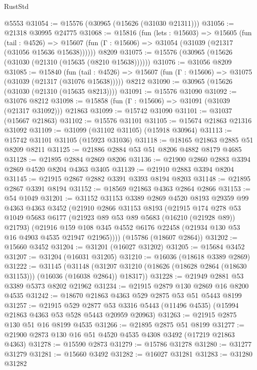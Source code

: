 \begin{lexlean}{RustStd}
\begin{coremodule}
    @5553
@31054 := @15576 (@30965 (@15626 (@31030 @21311)))
@31056 := @21318 @30995 @24775
@31068 := @15816
    (fun (lets : @15603) =>
    @15605
      (fun (tail : @4526) =>
      @15607 (fun (Γ : @15606) => @31054 (@31039 (@21317 (@31056 @15636 @15638))))))
    @8209
@31075 := @15576 (@30965 (@15626 (@31030 (@21310 (@15635 (@8210 @15638))))))
@31076 := @31056 @8209
@31085 := @15840
    (fun (tail : @4526) => @15607 (fun (Γ : @15606) => @31075 (@31039 (@21317 (@31076 @15638)))))
    @8212
@31090 := @30965 (@15626 (@31030 (@21310 (@15635 @8213))))
@31091 := @15576 @31090
@31092 := @31076 @8212
@31098 := @15858 (fun (Γ : @15606) => @31091 (@31039 (@21317 @31092))) @21863
@31099 := @15742 @31090
@31101 := @31037 (@15667 @21863)
@31102 := @15576 @31101
@31105 := @15674 @21863 @21316 @31092
@31109 := @31099 (@31102 @31105) (@15918 @30964)
@31113 := @15742 @31101 @31105 (@15923 @31036)
@31118 := @18165 @21863 @2885 @51 @8209 @8211
@31125 := @21886 @2884 @53 @51 @8206 @4882 @8179 @4685
@31128 := @21895 @2884 @2869 @8206
@31136 := @21900 @2860 @2883 @3394 @2869 @4520 @8204 @4363 @3405
@31139 := @21910 @2883 @3394 @8204
@31145 := @21915 @2867 @2882 @3391 @3393 @8194 @8203
@31148 := @21895 @2867 @3391 @8194
@31152 := @18569 @21863 @4363 @2864 @2866
@31153 := @54 @1049
@31201 := @31152
    @31153
    @3389
    @2869
    @4520
    @8193
    @29359
    @99
    @4363
    @4363
    @3452
    (@21910
      @2866
      @31153
      @8193
      (@21915
        @174
        @278
        @53
        @1049
        @5683
        @6177
        (@21923 @89 @53 @89 @5683 (@16210 (@21928 @89)) @21793)
        (@21916 @159 @108 @345 @4552 @6176 @22458 (@21934 @130 @53 @16 @4903 @4535 @21947 @21965))))
    (@15786 (@18607 @2864))
@31202 := @15660 @3452
@31204 := @31201 (@16027 @31202)
@31205 := @15684 @3452
@31207 := @31204 (@16031 @31205)
@31210 := @16036 (@18618 @3389 @2869)
@31222 := @31145
    (@31148 (@31207 @31210 (@18626 (@18628 @2864 (@18630 @31153))) (@16036 (@16038 @2864)) @18317))
@31228 := @21949 @2881 @53 @3389 @5373 @8202 @21962
@31234 := @21915 @2879 @130 @2869 @16 @8200 @4535
@31242 := @18670 @21863 @4363 @529 @2875 @53 @51 @5443 @8199
@31257 := @21915
    @529
    @2877
    @53
    @3316
    @5443
    (@11496 @4535)
    (@15994 @21863 @4363 @53 @528 @5443 @20959 @20963)
@31263 := @21915 @2875 @130 @51 @16 @8199 @4535
@31266 := @21895 @2875 @51 @8199
@31277 := @21900 @2873 @130 @16 @51 @4520 @4535 @4308 @3492 (@17219 @21863 @4363)
@31278 := @15590 @2873
@31279 := @15786 @31278
@31280 := @31277 @31279
@31281 := @15660 @3492
@31282 := @16027 @31281
@31283 := @31280 @31282

\end{coremodule}
\end{lexlean}
